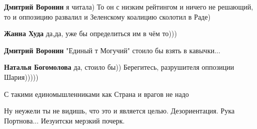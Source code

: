 \begin{itemize}
\begin{itemize}
\textbf{Дмитрий Воронин} я читала) То он с низким рейтингом и ничего не решающий, то и оппозицию развалил и Зеленскому коалицию сколотил в Раде)

 
\textbf{Жанна Худа} да,да, уже бы определиться им в чём то)))

 
\textbf{Дмитрий Воронин}
"Единый т Могучий" стоило бы взять в кавычки...

 
\textbf{Наталья Богомолова} да, стоило бы))
Берегитесь, разрушителя оппозиции Шария)))))
\end{itemize}

 
С такими единомышленниками как Страна и врагов не надо

 

Ну неужели ты не видишь, что это и является целью. Дезориентация. Рука
Портнова... Иезуитски мерзкий почерк.


 

\end{itemize}
